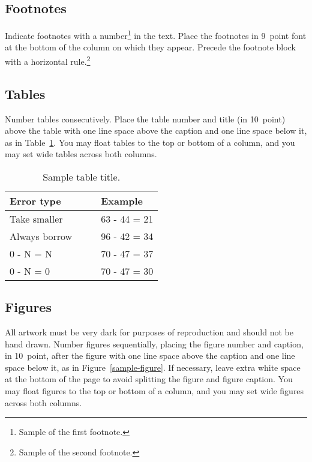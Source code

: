 \documentclass[10pt,letterpaper]{article}
\begin{document}
\subsection{Footnotes}

Indicate footnotes with a number\footnote{Sample of the first
footnote.} in the text. Place the footnotes in 9~point font at the
bottom of the column on which they appear. Precede the footnote block
with a horizontal rule.\footnote{Sample of the second footnote.}


\subsection{Tables}

Number tables consecutively. Place the table number and title (in
10~point) above the table with one line space above the caption and
one line space below it, as in Table~\ref{sample-table}. You may float
tables to the top or bottom of a column, and you may set wide tables across
both columns.

\begin{table}[H]
\begin{center} 
\caption{Sample table title.} 
\label{sample-table} 
\vskip 0.12in
\begin{tabular}{ll} 
\hline
Error type    &  Example \\
\hline
Take smaller        &   63 - 44 = 21 \\
Always borrow~~~~   &   96 - 42 = 34 \\
0 - N = N           &   70 - 47 = 37 \\
0 - N = 0           &   70 - 47 = 30 \\
\hline
\end{tabular} 
\end{center} 
\end{table}


\subsection{Figures}

All artwork must be very dark for purposes of reproduction and should
not be hand drawn. Number figures sequentially, placing the figure
number and caption, in 10~point, after the figure with one line space
above the caption and one line space below it, as in
Figure~\ref{sample-figure}. If necessary, leave extra white space at
the bottom of the page to avoid splitting the figure and figure
caption. You may float figures to the top or bottom of a column, and
you may set wide figures across both columns.
\end{document}
